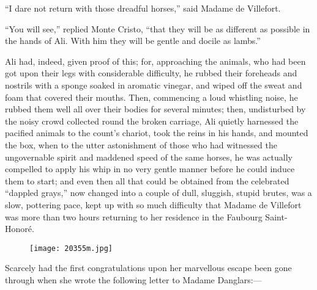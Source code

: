 “I dare not return with those dreadful horses,” said Madame de
Villefort.

“You will see,” replied Monte Cristo, “that they will be as different
as possible in the hands of Ali. With him they will be gentle and
docile as lambs.”

Ali had, indeed, given proof of this; for, approaching the animals, who
had been got upon their legs with considerable difficulty, he rubbed
their foreheads and nostrils with a sponge soaked in aromatic vinegar,
and wiped off the sweat and foam that covered their mouths. Then,
commencing a loud whistling noise, he rubbed them well all over their
bodies for several minutes; then, undisturbed by the noisy crowd
collected round the broken carriage, Ali quietly harnessed the pacified
animals to the count’s chariot, took the reins in his hands, and
mounted the box, when to the utter astonishment of those who had
witnessed the ungovernable spirit and maddened speed of the same
horses, he was actually compelled to apply his whip in no very gentle
manner before he could induce them to start; and even then all that
could be obtained from the celebrated “dappled grays,” now changed into
a couple of dull, sluggish, stupid brutes, was a slow, pottering pace,
kept up with so much difficulty that Madame de Villefort was more than
two hours returning to her residence in the Faubourg Saint-Honoré.

\begin{figure}[ht]
\texttt{[image: 20355m.jpg]}
\end{figure}

Scarcely had the first congratulations upon her marvellous escape been
gone through when she wrote the following letter to Madame Danglars:—


